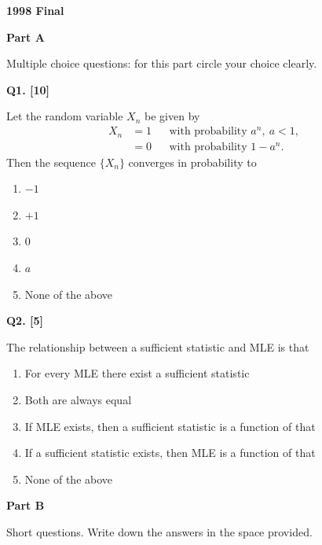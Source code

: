 \documentclass[11pt]{article}
\begin{document}
\begin{center}
    {\Large\bfseries 1998 Final}
\end{center}

\vspace{1em}

\begin{center}
\textbf{Part A}
\end{center}

\begingroup
\small
\setlength{\parskip}{0.1em}
Multiple choice questions: for this part circle your choice clearly.

\medskip
\textbf{Q1. [10]}

Let the random variable $X_n$ be given by
\[
\begin{aligned}
X_n &= 1 &&\text{with probability } a^n,\ a<1,\\
    &= 0 &&\text{with probability } 1-a^n.
\end{aligned}
\]
Then the sequence $\{X_n\}$ converges in probability to
\begin{enumerate}
\setlength{\itemsep}{0pt}\setlength{\parsep}{0pt}\setlength{\topsep}{2pt}
\item[(a)] $-1$
\item[(b)] $+1$
\item[(c)] $0$
\item[(d)] $a$
\item[(e)] None of the above
\end{enumerate}

\medskip
\textbf{Q2. [5]}

The relationship between a sufficient statistic and MLE is that
\begin{enumerate}
\setlength{\itemsep}{0pt}\setlength{\parsep}{0pt}\setlength{\topsep}{2pt}
\item[(a)] For every MLE there exist a sufficient statistic
\item[(b)] Both are always equal
\item[(c)] If MLE exists, then a sufficient statistic is a function of that
\item[(d)] If a sufficient statistic exists, then MLE is a function of that
\item[(e)] None of the above
\end{enumerate}
\endgroup

\clearpage

\begin{center}
\textbf{Part B}
\end{center}

Short questions. Write down the answers in the space provided.
\end{document}
